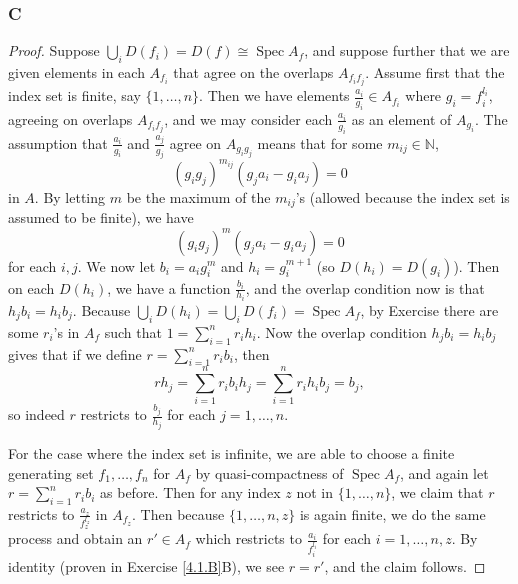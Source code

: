 \documentclass{article}
\newcommand{\N}{\mathbb{N}}
\DeclareMathOperator{\Spec}{\mathrm{Spec}}
\begin{document}
\subsubsection{C}\label{4.1.C}
\begin{proof}
    Suppose $\bigcup_i D(f_i) = D(f)\cong \Spec A_f$, and suppose further that we are given elements in each $A_{f_i}$ that agree on the overlaps $A_{f_i f_j}$. Assume first that the index set is finite, say $\{1, \dots, n\}$. Then we have elements $\frac{a_i}{g_i}\in A_{f_i}$ where $g_i=f_i^{l_i}$, agreeing on overlaps $A_{f_if_j}$, and we may consider each $\frac{a_i}{g_i}$ as an element of $A_{g_i}$. The assumption that $\frac{a_i}{g_i}$ and $\frac{a_j}{g_j}$ agree on $A_{g_ig_j}$ means that for some $m_{ij}\in \N$, $$(g_ig_j)^{m_{ij}}(g_j a_i - g_i a_j)=0$$ in $A$. By letting $m$ be the maximum of the $m_{ij}$'s (allowed because the index set is assumed to be finite), we have
    \[
    (g_i g_j)^m (g_j a_i - g_i a_j)=0
    \]
    for each $i,j$. We now let $b_i = a_i g_i^m$ and $h_i = g_i ^{m+1}$ (so $D(h_i)=D(g_i)$). Then on each $D(h_i)$, we have a function $\frac{b_i}{h_i}$, and the overlap condition now is that $h_j b_i = h_i b_j$. Because $\bigcup_i D(h_i)=\bigcup_i D(f_i)=\Spec A_f$, by Exercise  %
    there are some $r_i$'s in $A_f$ such that $1=\sum_{i=1}^n r_i h_i$. Now the overlap condition $h_jb_i=h_i b_j$ gives that if we define $r=\sum_{i=1}^n r_i b_i$, then
    \[
    rh_j = \sum_{i=1}^n r_i b_i h_j = \sum_{i=1}^n r_i h_i b_j = b_j,
    \]
    so indeed $r$ restricts to $\frac{b_j}{h_j}$ for each $j=1, \dots, n$.

    For the case where the index set is infinite, we are able to choose a finite generating set $f_1, \dots, f_n$ for $A_f$ by quasi-compactness of $\Spec A_f$, and again let $r=\sum_{i=1}^n r_i b_i$ as before. Then for any index $z$ not in $\{1, \dots, n\}$, we claim that $r$ restricts to $\frac{a_z}{f_z^{l_z}}$ in $A_{f_z}$. Then because $\{1, \dots, n , z\}$ is again finite, we do the same process and obtain an $r'\in A_f$ which restricts to $\frac{a_i}{f_i^{l_i}}$ for each $i=1, \dots, n, z$. By identity (proven in Exercise \ref{4.1.B}B), we see $r=r'$, and the claim follows.
\end{proof}
\end{document}

